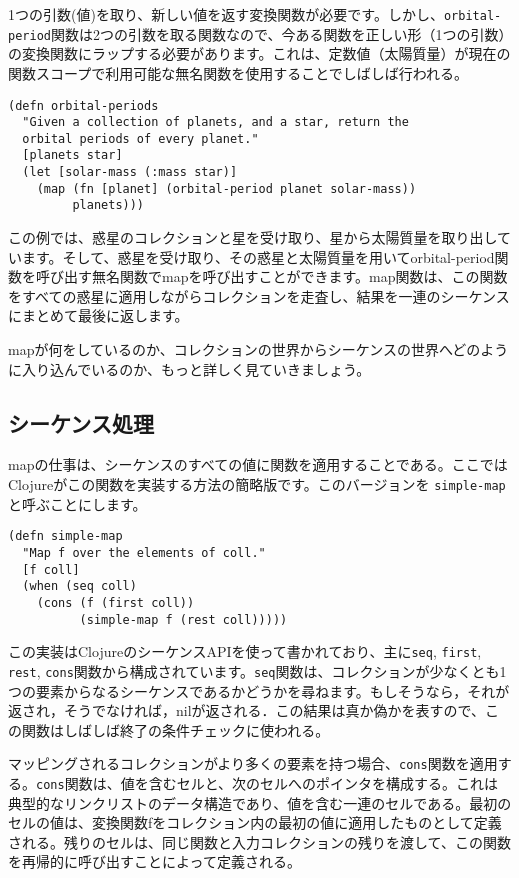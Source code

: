 1つの引数(値)を取り、新しい値を返す変換関数が必要です。しかし、\texttt{orbital-period}関数は2つの引数を取る関数なので、今ある関数を正しい形（1つの引数）の変換関数にラップする必要があります。これは、定数値（太陽質量）が現在の関数スコープで利用可能な無名関数を使用することでしばしば行われる。

\begin{lstlisting}[numbers=none]
(defn orbital-periods
  "Given a collection of planets, and a star, return the
  orbital periods of every planet."
  [planets star]
  (let [solar-mass (:mass star)]
    (map (fn [planet] (orbital-period planet solar-mass))
         planets)))
\end{lstlisting}

この例では、惑星のコレクションと星を受け取り、星から太陽質量を取り出しています。そして、惑星を受け取り、その惑星と太陽質量を用いてorbital-period関数を呼び出す無名関数でmapを呼び出すことができます。map関数は、この関数をすべての惑星に適用しながらコレクションを走査し、結果を一連のシーケンスにまとめて最後に返します。

mapが何をしているのか、コレクションの世界からシーケンスの世界へどのように入り込んでいるのか、もっと詳しく見ていきましょう。


\subsection{シーケンス処理}

 mapの仕事は、シーケンスのすべての値に関数を適用することである。ここでは Clojureがこの関数を実装する方法の簡略版です。このバージョンを \texttt{simple-map} と呼ぶことにします。


\begin{lstlisting}[numbers=none]
(defn simple-map
  "Map f over the elements of coll."
  [f coll]
  (when (seq coll)
    (cons (f (first coll))
          (simple-map f (rest coll)))))
\end{lstlisting}

この実装はClojureのシーケンスAPIを使って書かれており、主に\texttt{seq}, \texttt{first}, \texttt{rest}, \texttt{cons}関数から構成されています。\texttt{seq}関数は、コレクションが少なくとも1つの要素からなるシーケンスであるかどうかを尋ねます。もしそうなら，それが返され，そうでなければ，nilが返される．この結果は真か偽かを表すので、この関数はしばしば終了の条件チェックに使われる。

マッピングされるコレクションがより多くの要素を持つ場合、\texttt{cons}関数を適用する。\texttt{cons}関数は、値を含むセルと、次のセルへのポインタを構成する。これは典型的なリンクリストのデータ構造であり、値を含む一連のセルである。最初のセルの値は、変換関数fをコレクション内の最初の値に適用したものとして定義される。残りのセルは、同じ関数と入力コレクションの残りを渡して、この関数を再帰的に呼び出すことによって定義される。

